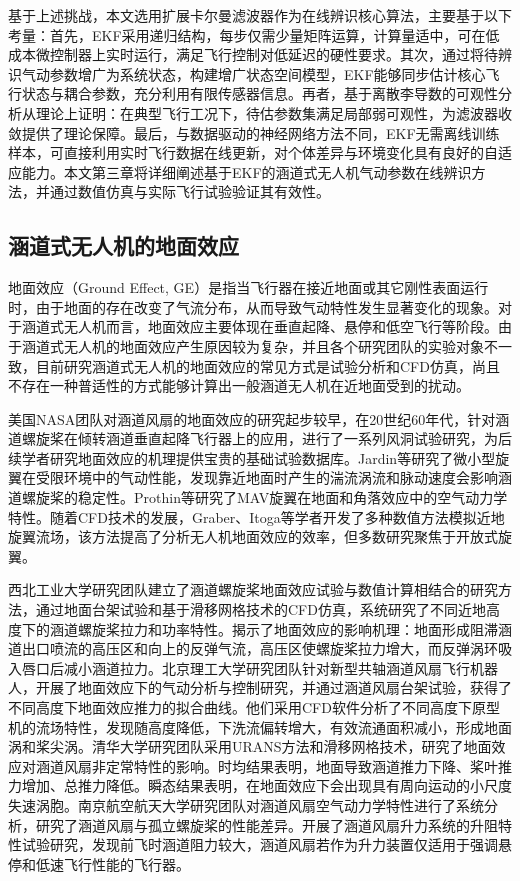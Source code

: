 基于上述挑战，本文选用扩展卡尔曼滤波器作为在线辨识核心算法，主要基于以下考量：首先，EKF采用递归结构，每步仅需少量矩阵运算，计算量适中，可在低成本微控制器上实时运行，满足飞行控制对低延迟的硬性要求。其次，通过将待辨识气动参数增广为系统状态，构建增广状态空间模型，EKF能够同步估计核心飞行状态与耦合参数，充分利用有限传感器信息。再者，基于离散李导数的可观性分析从理论上证明：在典型飞行工况下，待估参数集满足局部弱可观性，为滤波器收敛提供了理论保障。最后，与数据驱动的神经网络方法不同，EKF无需离线训练样本，可直接利用实时飞行数据在线更新，对个体差异与环境变化具有良好的自适应能力。本文第三章将详细阐述基于EKF的涵道式无人机气动参数在线辨识方法，并通过数值仿真与实际飞行试验验证其有效性。

\subsection{涵道式无人机的地面效应}
地面效应（Ground Effect, GE）是指当飞行器在接近地面或其它刚性表面运行时，由于地面的存在改变了气流分布，从而导致气动特性发生显著变化的现象\cite{matuz2021ground}。对于涵道式无人机而言，地面效应主要体现在垂直起降、悬停和低空飞行等阶段。由于涵道式无人机的地面效应产生原因较为复杂，并且各个研究团队的实验对象不一致，目前研究涵道式无人机的地面效应的常见方式是试验分析和CFD仿真，尚且不存在一种普适性的方式能够计算出一般涵道无人机在近地面受到的扰动。

美国NASA团队对涵道风扇的地面效应的研究起步较早，在20世纪60年代，针对涵道螺旋桨在倾转涵道垂直起降飞行器上的应用，进行了一系列风洞试验研究，为后续学者研究地面效应的机理提供宝贵的基础试验数据库\cite{yaggy1961aerodynamics}\cite{yaggy1961wind}。Jardin等研究了微小型旋翼在受限环境中的气动性能，发现靠近地面时产生的湍流涡流和脉动速度会影响涵道螺旋桨的稳定性\cite{jardin2017aerodynamic}。Prothin等研究了MAV旋翼在地面和角落效应中的空气动力学特性\cite{prothin2019aerodynamics}。随着CFD技术的发展，Graber、Itoga等学者开发了多种数值方法模拟近地旋翼流场，该方法提高了分析无人机地面效应的效率，但多数研究聚焦于开放式旋翼\cite{graber1990investigation}。

西北工业大学研究团队建立了涵道螺旋桨地面效应试验与数值计算相结合的研究方法，通过地面台架试验和基于滑移网格技术的CFD仿真，系统研究了不同近地高度下的涵道螺旋桨拉力和功率特性\cite{deng2020ground}。揭示了地面效应的影响机理：地面形成阻滞涵道出口喷流的高压区和向上的反弹气流，高压区使螺旋桨拉力增大，而反弹涡环吸入唇口后减小涵道拉力\cite{Aerodynamic_performance_assessment_of_a_ducted_fan_UAV}。北京理工大学研究团队针对新型共轴涵道风扇飞行机器人，开展了地面效应下的气动分析与控制研究，并通过涵道风扇台架试验，获得了不同高度下地面效应推力的拟合曲线\cite{ai2020aerodynamic}。他们采用CFD软件分析了不同高度下原型机的流场特性，发现随高度降低，下洗流偏转增大，有效流通面积减小，形成地面涡和桨尖涡\cite{fan2022novel}。清华大学研究团队采用URANS方法和滑移网格技术，研究了地面效应对涵道风扇非定常特性的影响。时均结果表明，地面导致涵道推力下降、桨叶推力增加、总推力降低。瞬态结果表明，在地面效应下会出现具有周向运动的小尺度失速涡胞\cite{luo2023numerical}。南京航空航天大学研究团队对涵道风扇空气动力学特性进行了系统分析，研究了涵道风扇与孤立螺旋桨的性能差异\cite{li2005aerodynamic}。开展了涵道风扇升力系统的升阻特性试验研究，发现前飞时涵道阻力较大，涵道风扇若作为升力装置仅适用于强调悬停和低速飞行性能的飞行器\cite{li2004experimental}。

